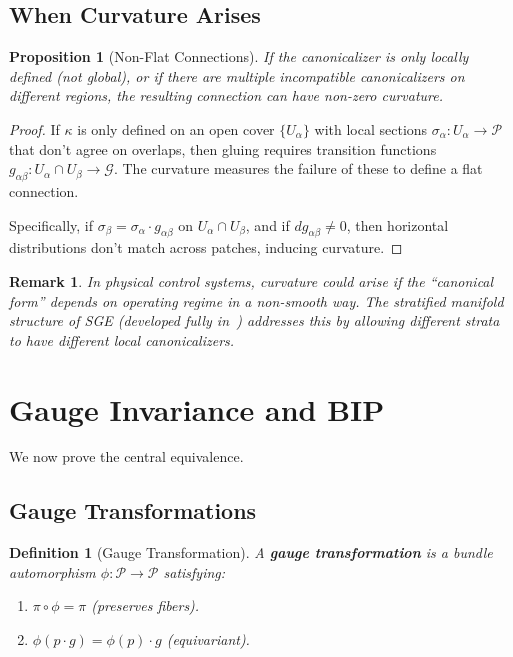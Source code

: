 \documentclass[11pt]{article}
\newtheorem{proposition}[theorem]{Proposition}
\newtheorem{definition}[theorem]{Definition}
\newtheorem{remark}[theorem]{Remark}
\begin{document}
\subsection{When Curvature Arises}

\begin{proposition}[Non-Flat Connections]
If the canonicalizer is only locally defined (not
global), or if there are multiple incompatible canonicalizers on different regions, the resulting
connection can have non-zero curvature.
\end{proposition}

\begin{proof}
If $\kappa$ is only defined on an open cover $\{U_\alpha\}$ with local sections $\sigma_\alpha : U_\alpha \to \mathcal{P}$ that don't
agree on overlaps, then gluing requires transition functions $g_{\alpha\beta} : U_\alpha \cap U_\beta \to \mathcal{G}$. The curvature
measures the failure of these to define a flat connection.

Specifically, if $\sigma_\beta = \sigma_\alpha \cdot g_{\alpha\beta}$ on $U_\alpha \cap U_\beta$, and if $dg_{\alpha\beta} \neq 0$, then horizontal distributions don't
match across patches, inducing curvature.
\end{proof}

\begin{remark}
In physical control systems, curvature could arise if the ``canonical form'' depends
on operating regime in a non-smooth way. The stratified manifold structure of SGE (developed fully in~\cite{bond2026ge}) addresses
this by allowing different strata to have different local canonicalizers.
\end{remark}

\section{Gauge Invariance and BIP}

We now prove the central equivalence.

\subsection{Gauge Transformations}

\begin{definition}[Gauge Transformation]
A \textbf{gauge transformation} is a bundle automorphism
$\phi : \mathcal{P} \to \mathcal{P}$ satisfying:
\begin{enumerate}
    \item[(i)] $\pi \circ \phi = \pi$ (preserves fibers).
    \item[(ii)] $\phi(p \cdot g) = \phi(p) \cdot g$ (equivariant).
\end{enumerate}
\end{definition}
\end{document}
